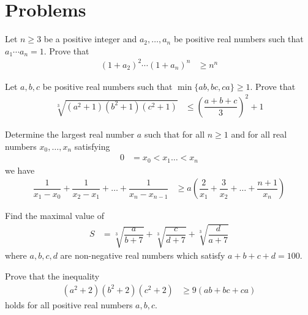 \documentclass{subfile}
\begin{document}
	\chapter{Problems}\label{ch:problems}
	\textcite{djukicc_jankovic_matic_2011}
		\begin{problem}
			Let $n\geq3$ be a positive integer and $a_2,\ldots,a_n$ be positive real numbers such that $a_1\cdots a_n=1$. Prove that
				\begin{align*}
					(1+a_2)^{2}\cdots(1+a_n)^{n}
						& \geq n^{n}
				\end{align*}
		\end{problem}
	
		\begin{problem}
			Let $a,b,c$ be positive real numbers such that $\min\{ab,bc,ca\}\geq1$. Prove that
				\begin{align*}
					\sqrt[3]{(a^2+1)(b^2+1)(c^2+1)}
						& \leq\left(\dfrac{a+b+c}{3}\right)^2+1
				\end{align*}
		\end{problem}
	
		\begin{problem}
			Determine the largest real number $a$ such that for all $n\geq1$ and for all real numbers $x_{0},\ldots,x_{n}$ satisfying
				\begin{align*}
					0
						& = x_{0}<x_{1}\ldots<x_{n}
				\end{align*}
			we have
				\begin{align*}
					\dfrac{1}{x_{1}-x_{0}}+\dfrac{1}{x_{2}-x_{1}}+\ldots+\dfrac{1}{x_{n}-x_{n-1}}
						& \geq a\left(\dfrac{2}{x_{1}}+\dfrac{3}{x_{2}}+\ldots+\dfrac{n+1}{x_{n}}\right)
				\end{align*}
		\end{problem}
	
		\begin{problem}
			Find the maximal value of
				\begin{align*}
					S
						& = \sqrt[3]{\dfrac{a}{b+7}}+\sqrt[3]{\dfrac{c}{d+7}}+\sqrt[3]{\dfrac{d}{a+7}}
				\end{align*}
			where $a,b,c,d$ are non-negative real numbers which satisfy $a+b+c+d=100$.
		\end{problem}
	
		\begin{problem}
			Prove that the inequality
				\begin{align*}
					(a^{2}+2)(b^{2}+2)(c^{2}+2)
						& \geq9(ab+bc+ca)
				\end{align*}
			holds for all positive real numbers $a,b,c$.
		\end{problem}
	
\end{document}
